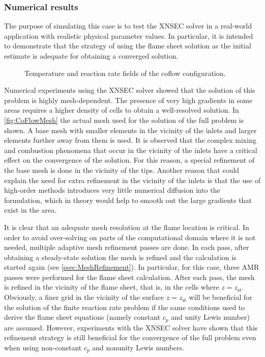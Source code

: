 \subsubsection{Numerical results}
The purpose of simulating this case is to test the XNSEC solver in a real-world application with realistic physical parameter values. In particular, it is intended to demonstrate that the strategy of using the flame sheet solution as the initial estimate is adequate for obtaining a converged solution.%
\begin{figure}[t!]
	\centering
	\pgfplotsset{width=0.6\textwidth, compat=1.3}
	\hspace{-2.4cm} 	
	\caption{Temperature and reaction rate fields of the coflow configuration.} \label{fig:CoFlowFlameFig}
\end{figure}
Numerical experiments using the XNSEC solver showed that the solution of this problem is highly mesh-dependent. The presence of very high gradients in some areas requires a higher density of cells to obtain a well-resolved solution.  In \cref{fig:CoFlowMesh} the actual mesh used for the solution of the full problem is shown.  A base mesh with smaller elements in the vicinity of the inlets and larger elements further away from them is used. It is observed that the complex mixing and combustion phenomena that occur in the vicinity of the inlets have a critical effect on the convergence of the solution. For this reason, a special refinement of the base mesh is done in the vicinity of the tips. Another reason that could explain the need for extra refinement in the vicinity of the inlets is that the use of high-order methods introduces very little numerical diffusion into the formulation, which in theory would help to smooth out the large gradients that exist in the area. 

It is clear that an adequate mesh resolution at the flame location is critical. In order to avoid over-solving on parts of the computational domain where it is not needed, multiple adaptive mesh refinement passes are done.  In each pass, after obtaining a steady-state solution the mesh is refined and the calculation is started again (see \cref{ssec:MeshRefinement}). In particular, for this case, three AMR passes were performed for the flame sheet calculation. After each pass, the mesh is refined in the vicinity of the flame sheet, that is, in the cells where $z = z_{\text{st}}$. 
Obviously, a finer grid in the vicinity of the surface $z = z_{\text{st}}$ will be beneficial for the solution of the finite reaction rate problem if the same conditions used to derive the flame sheet equations (namely constant $c_p$ and unity Lewis number) are assumed.  
However, experiments with the XNSEC solver have shown that this refinement strategy is still beneficial for the convergence of the full problem even when using non-constant $c_p$ and nonunity Lewis numbers.

